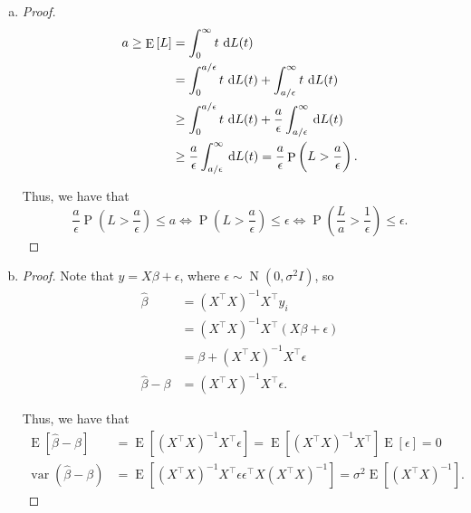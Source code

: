 \documentclass[letterpaper]{article}
\DeclareMathOperator{\E}{E}
\DeclareMathOperator{\Prob}{P}
\begin{document}
\begin{enumerate}[(a)]
\begin{proof}
    There is an additional $\sigma^2$ term to account for the variance of our
    new observation.
  \end{proof}
\item
  \begin{proof}
    \begin{align*}
      a \geq \E\left[L\right]
      &= \int_0^\infty t \,\dif L(t) \\
      &= \int_0^{a/\epsilon} t \,\dif L(t) + \int_{a/\epsilon}^\infty t \,\dif L(t) \\
      &\geq \int_0^{a/\epsilon} t \,\dif L(t) + \frac{a}{\epsilon}\int_{a/\epsilon}^\infty \,\dif L(t) \\
      &\geq \frac{a}{\epsilon}\int_{a/\epsilon}^\infty \,\dif L(t) = \frac{a}{\epsilon}\Prob\left(L > \frac{a}{\epsilon}\right).
    \end{align*}

    Thus, we have that
    \begin{equation*}
      \frac{a}{\epsilon}\Prob\left(L > \frac{a}{\epsilon}\right) \leq a
      \Leftrightarrow
      \Prob\left(L > \frac{a}{\epsilon}\right) \leq \epsilon
      \Leftrightarrow
      \Prob\left(\frac{L}{a} > \frac{1}{\epsilon}\right) \leq \epsilon.
    \end{equation*}
  \end{proof}
\item
  \begin{proof}
    Note that $y = X\beta + \epsilon$, where
    $\epsilon \sim \operatorname{N}\left(0, \sigma^2I\right)$, so
    \begin{align*}
      \hat{\beta}
      &= \left(X^\top X\right)^{-1}X^\top y_i \\
      &= \left(X^\top X\right)^{-1}X^\top \left(X\beta + \epsilon\right) \\
      &= \beta + \left(X^\top X\right)^{-1}X^\top\epsilon \\
      \hat{\beta} - \beta &= \left(X^\top X\right)^{-1}X^\top\epsilon.
    \end{align*}

    Thus, we have that
    \begin{align*}
      \E\left[\hat{\beta} - \beta\right]
      &= \E\left[\left(X^\top X\right)^{-1}X^\top\epsilon\right]
        = \E\left[\left(X^\top X\right)^{-1}X^\top\right]
        \E\left[\epsilon\right] = 0 \\
      \operatorname{var}\left(\hat{\beta} - \beta\right)
      &=
        \E\left[\left(X^\top X\right)^{-1}X^\top\epsilon\epsilon^\top X
        \left(X^\top X\right)^{-1}\right]
        = \sigma^2\E\left[\left(X^\top X\right)^{-1}\right].
    \end{align*}
    

\end{proof}
\end{enumerate}
\end{document}
